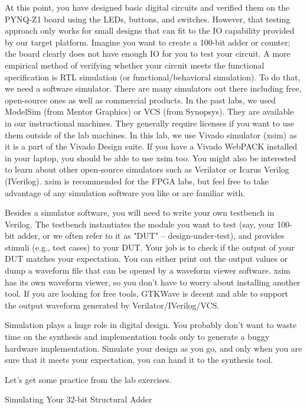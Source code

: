 \documentclass[11pt]{article}
\makeatletter
\renewcommand{\section}
{\@startsection {section}{1}{0pt}
 {-2ex}
 {1ex}
 {\bfseries\Large}}
\makeatother
\begin{document}
At this point, you have designed basic digital circuits and verified them on the PYNQ-Z1 board using the LEDs, buttons, and switches. However, that testing approach only works for small designs that can fit to the IO capability provided by our target platform. Imagine you want to create a 100-bit adder or counter; the board clearly does not have enough IO for you to test your circuit. A more empirical method of verifying whether your circuit meets the functional specification is RTL simulation (or functional/behavioral simulation). To do that, we need a software simulator. There are many simulators out there including free, open-source ones as well as commercial products. In the past labs, we used ModelSim (from Mentor Graphics) or VCS (from Synopsys). They are available in our instructional machines. They generally require licenses if you want to use them outside of the lab machines. In this lab, we use Vivado simulator (xsim) as it is a part of the Vivado Design suite. If you have a Vivado WebPACK installed in your laptop, you should be able to use xsim too. You might also be interested to learn about other open-source simulators such as Verilator or Icarus Verilog (IVerilog). xsim is recommended for the FPGA labs, but feel free to take advantage of any simulation software you like or are familiar with.

Besides a simulator software, you will need to write your own testbench in Verilog. The testbench instantiates the module you want to test (say, your 100-bit adder, or we often refer to it as "DUT" -- design-under-test), and provides stimuli (e.g., test cases) to your DUT. Your job is to check if the output of your DUT matches your expectation. You can either print out the output values or dump a waveform file that can be opened by a waveform viewer software. xsim has its own waveform viewer, so you don't have to worry about installing another tool. If you are looking for free tools, GTKWave is decent and able to support the output waveform generated by Verilator/IVerilog/VCS.

Simulation plays a huge role in digital design. You probably don't want to waste time on the synthesis and implementation tools only to generate a buggy hardware implementation. Simulate your design as you go, and only when you are sure that it meets your expectation, you can hand it to the synthesis tool.

Let's get some practice from the lab exercises.

\section{Simulating Your 32-bit Structural Adder}
\end{document}

